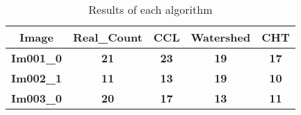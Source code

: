 \begin{table}[H]
\centering
\begin{tabular}{|c|c|c|c|c|}
\hline
 \textbf{Image} & \textbf{Real\_Count} & \textbf{CCL} & \textbf{Watershed} & \textbf{CHT} \\ \hline
 \textbf{Im001\_0} & \textbf{21} & \textbf{23} & \textbf{19} & \textbf{17} \\ \hline
 \textbf{Im002\_1} & \textbf{11} & \textbf{13} & \textbf{19} & \textbf{10} \\ \hline
 \textbf{Im003\_0} & \textbf{20} & \textbf{17} & \textbf{13} & \textbf{11} \\ \hline

\end{tabular}
\caption{Results of each algorithm}
\label{Results of each algorithm}
\end{table}
